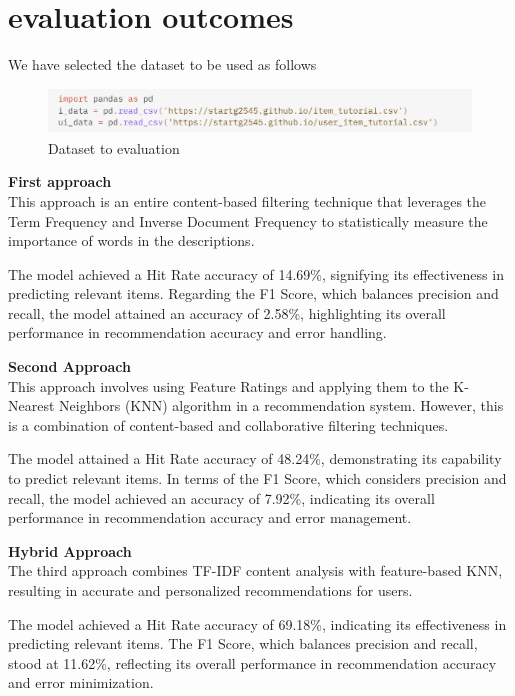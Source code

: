 \section{evaluation outcomes}

We have selected the dataset to be used as follows
\begin{figure}[H]
\center
\includegraphics[width=6in]{img/Data.png}
\caption{Dataset to evaluation}
\end{figure}

\textbf{First approach}\\
This approach is an entire content-based filtering technique that leverages the Term Frequency and Inverse Document Frequency to statistically measure the importance of words in the descriptions.

The model achieved a Hit Rate accuracy of 14.69\%, signifying its effectiveness in predicting relevant items. Regarding the F1 Score, which balances precision and recall, the model attained an accuracy of 2.58\%, highlighting its overall performance in recommendation accuracy and error handling.

\textbf{Second Approach}\\
This approach involves using Feature Ratings and applying them to the K-Nearest Neighbors (KNN) algorithm in a recommendation system. However, this is a combination of content-based and collaborative filtering techniques.

The model attained a Hit Rate accuracy of 48.24\%, demonstrating its capability to predict relevant items. In terms of the F1 Score, which considers precision and recall, the model achieved an accuracy of 7.92\%, indicating its overall performance in recommendation accuracy and error management.

\textbf{Hybrid Approach}\\
The third approach combines TF-IDF content analysis with feature-based KNN, resulting in accurate and personalized recommendations for users.

The model achieved a Hit Rate accuracy of 69.18\%, indicating its effectiveness in predicting relevant items. The F1 Score, which balances precision and recall, stood at 11.62\%, reflecting its overall performance in recommendation accuracy and error minimization.
